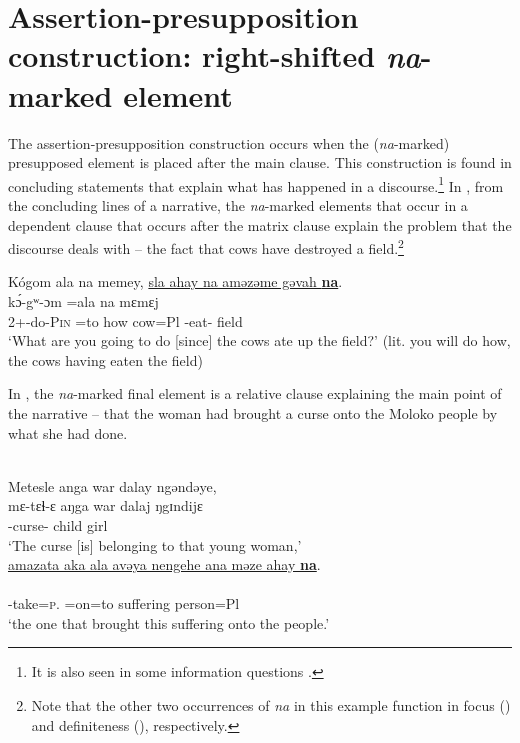 \section{Assertion-presupposition construction: right-shifted \textit{na}-marked element}\label{sec:11.3}
\hypertarget{RefHeading1213261525720847}{}
The assertion-presupposition construction occurs when the (\textit{na}{}-marked) presupposed element is placed after the main clause. This construction is found in concluding statements that explain what has happened in a discourse.\footnote{It is also seen in some information questions .} In , from the concluding lines of a narrative, the \textit{na}{}-marked elements that occur in a dependent clause that occurs after the matrix clause explain the problem that the discourse deals with -- the fact that cows have destroyed a field.\footnote{Note that the other two occurrences of \textit{na} in this example function in focus () and definiteness (), respectively.} 

\ea \label{ex:11:39}
Kógom  ala  na  memey,  \underline{sla  ahay  na  aməzəme  gəvah  \textbf{na}}.\\
\gll  k\'ɔ-gʷ{}-ɔm     =ala  na      mɛmɛj               \\
      2+{\IFV}-do-\textsc{Pin}  =to  {\PSP}   how   cow=Pl  {\PSP}  {\DEP}-eat{}-{\CL}  field  {\PSP}\\
\glt  ‘What are you going to do [since] the cows ate up the field?’ (lit. you will do how, the cows having eaten the field)
\z

In , the \textit{na}-marked final element is a relative clause explaining the main point of the narrative -- that the woman had brought a curse onto the Moloko people by what she had done. 

\ea \label{ex:11:40}
\\
Metesle  anga  war  dalay  ngəndəye, \\ 
\gll  mɛ-tɛɬ-ɛ  aŋga war dalaj  ŋgɪndijɛ \\ 
      {\NOM}{}-curse-{\CL}   {\POSS}   child  girl  {\DEM} \\
\glt ‘The curse [is] belonging to that young woman,’\\      
      
      \medskip
\underline{amazata  aka  ala  avəya  nengehe  ana  məze  ahay  \textbf{na}}. \\      
\gll {}        \\
     {\DEP}-take=\textsc{p}.{\IO}  =on=to suffering {\DEM}      {\DAT}  person=Pl   {\PSP}\\
\glt  ‘the one that brought this suffering onto the people.’  
\z

